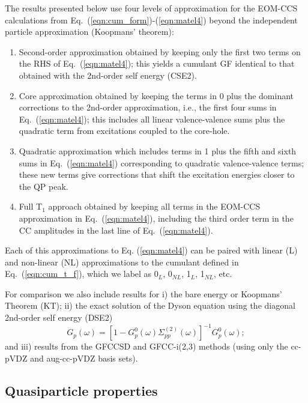 \documentclass[aps,prb,twocolumn,groupaddress,floatfix]{revtex4}
\begin{document}
The results presented below use four levels of approximation for the EOM-CCS
calculations from Eq.\ (\ref{eqn:cum_form})-(\ref{eqn:matel4}) beyond the
independent particle approximation (Koopmans' theorem):
\begin{enumerate}
\addtocounter{enumi}{-1}

\item Second-order approximation obtained by keeping only the first two terms on
the RHS of Eq.\ (\ref{eqn:matel4}); this yields a cumulant GF identical to that
obtained with the 2nd-order self energy (CSE2).

\item Core approximation obtained by keeping the terms
in 0 plus the dominant corrections to
the 2nd-order approximation, i.e., the first four sums in Eq.\
(\ref{eqn:matel4}); this  includes all linear valence-valence sums plus the
quadratic term from excitations coupled to the core-hole.

\item Quadratic approximation which includes terms in 1 plus the fifth and sixth
sums in Eq.\ (\ref{eqn:matel4}) corresponding to quadratic valence-valence
terms; these new terms give corrections that shift the excitation energies
closer to the QP peak.

\item Full T$_1$ approach obtained by keeping all terms in the EOM-CCS
approximation in Eq.\ (\ref{eqn:matel4}), including the third order term
in the CC amplitudes in the last line of Eq.\ (\ref{eqn:matel4}).

\end{enumerate}
Each of this approximations to Eq. (\ref{eqn:matel4}) can be paired with linear
(L) and non-linear (NL) approximations to the cumulant defined in  Eq.\
(\ref{eqn:cum_t_f}), which we label as 0$_L$, 0$_{NL}$, 1$_L$, 1$_{NL}$, etc.

For comparison we also include results for i) the bare energy or
Koopmans' Theorem (KT); ii) the exact solution of the Dyson equation
using the diagonal 2nd-order self energy (DSE2)
\begin{equation}
G_p(\omega) = [1-G^0_p(\omega)\Sigma^{(2)}_{pp}(\omega)]^{-1}G^0_p(\omega);
\end{equation}
and iii) results from the GFCCSD and GFCC-i(2,3) methods 
(using only the cc-pVDZ and aug-cc-pVDZ basis
sets).\cite{PengKowalski2018,doi:10.1063/1.5046529,doi:10.1021/acs.jctc.9b00172}

\subsection{Quasiparticle properties}
\end{document}
